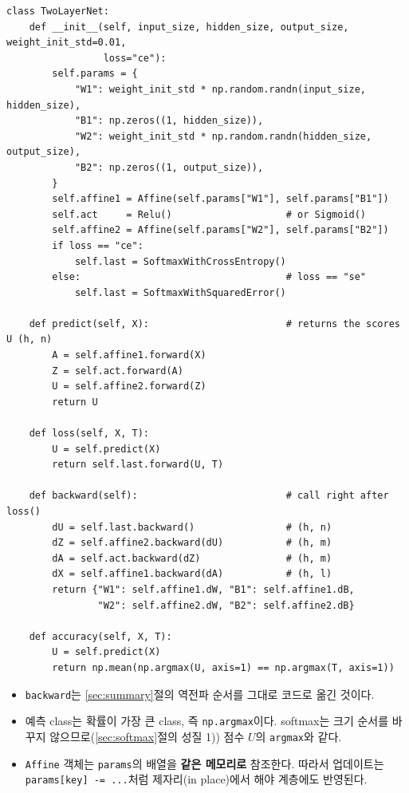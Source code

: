 \documentclass[11pt,a4paper]{article}
\begin{document}
\begin{lstlisting}
class TwoLayerNet:
    def __init__(self, input_size, hidden_size, output_size, weight_init_std=0.01,
                 loss="ce"):
        self.params = {
            "W1": weight_init_std * np.random.randn(input_size, hidden_size),
            "B1": np.zeros((1, hidden_size)),
            "W2": weight_init_std * np.random.randn(hidden_size, output_size),
            "B2": np.zeros((1, output_size)),
        }
        self.affine1 = Affine(self.params["W1"], self.params["B1"])
        self.act     = Relu()                    # or Sigmoid()
        self.affine2 = Affine(self.params["W2"], self.params["B2"])
        if loss == "ce":
            self.last = SoftmaxWithCrossEntropy()
        else:                                    # loss == "se"
            self.last = SoftmaxWithSquaredError()

    def predict(self, X):                        # returns the scores U (h, n)
        A = self.affine1.forward(X)
        Z = self.act.forward(A)
        U = self.affine2.forward(Z)
        return U

    def loss(self, X, T):
        U = self.predict(X)
        return self.last.forward(U, T)

    def backward(self):                          # call right after loss()
        dU = self.last.backward()                # (h, n)
        dZ = self.affine2.backward(dU)           # (h, m)
        dA = self.act.backward(dZ)               # (h, m)
        dX = self.affine1.backward(dA)           # (h, l)
        return {"W1": self.affine1.dW, "B1": self.affine1.dB,
                "W2": self.affine2.dW, "B2": self.affine2.dB}

    def accuracy(self, X, T):
        U = self.predict(X)
        return np.mean(np.argmax(U, axis=1) == np.argmax(T, axis=1))
\end{lstlisting}

\begin{itemize}[leftmargin=1.8em]
\item \texttt{backward}는 \ref{sec:summary}절의 역전파 순서를 그대로 코드로 옮긴 것이다.
\item 예측 class는 확률이 가장 큰 class, 즉 \texttt{np.argmax}이다.
softmax는 크기 순서를 바꾸지 않으므로(\ref{sec:softmax}절의 성질 1)) 점수 $U$의 \texttt{argmax}와 같다.
\item \texttt{Affine} 객체는 \texttt{params}의 배열을 \textbf{같은 메모리로} 참조한다.
따라서 업데이트는 \texttt{params[key] -= ...}처럼 제자리(in place)에서 해야 계층에도 반영된다.
\end{itemize}
\end{document}
